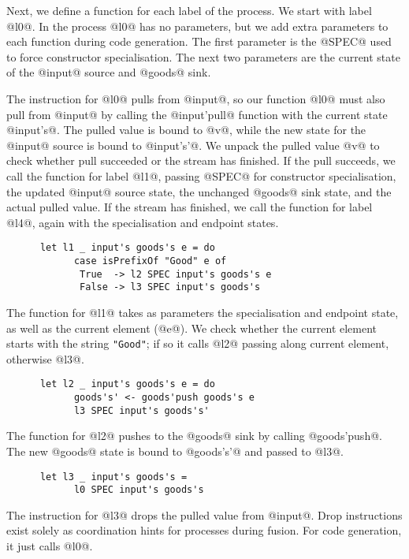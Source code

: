 Next, we define a function for each label of the process.
We start with label @l0@.
In the process @l0@ has no parameters, but we add extra parameters to each function during code generation.
The first parameter is the @SPEC@ used to force constructor specialisation.
The next two parameters are the current state of the @input@ source and @goods@ sink.

The instruction for @l0@ pulls from @input@, so our function @l0@ must also pull from @input@ by calling the @input'pull@ function with the current state @input's@.
The pulled value is bound to @v@, while the new state for the @input@ source is bound to @input's'@.
We unpack the pulled value @v@ to check whether pull succeeded or the stream has finished.
If the pull succeeds, we call the function for label @l1@, passing @SPEC@ for constructor specialisation, the updated @input@ source state, the unchanged @goods@ sink state, and the actual pulled value.
If the stream has finished, we call the function for label @l4@, again with the specialisation and endpoint states.


\begin{lstlisting}
      let l1 _ input's goods's e = do
            case isPrefixOf "Good" e of
             True  -> l2 SPEC input's goods's e
             False -> l3 SPEC input's goods's
\end{lstlisting}

The function for @l1@ takes as parameters the specialisation and endpoint state, as well as the current element (@e@).
We check whether the current element starts with the string \lstinline/"Good"/; if so it calls @l2@ passing along current element, otherwise @l3@.

\begin{lstlisting}
      let l2 _ input's goods's e = do
            goods's' <- goods'push goods's e
            l3 SPEC input's goods's'
\end{lstlisting}

The function for @l2@ pushes to the @goods@ sink by calling @goods'push@.
The new @goods@ state is bound to @goods's'@ and passed to @l3@.

\begin{lstlisting}
      let l3 _ input's goods's =
            l0 SPEC input's goods's
\end{lstlisting}

The instruction for @l3@ drops the pulled value from @input@.
Drop instructions exist solely as coordination hints for processes during fusion.
For code generation, it just calls @l0@.

